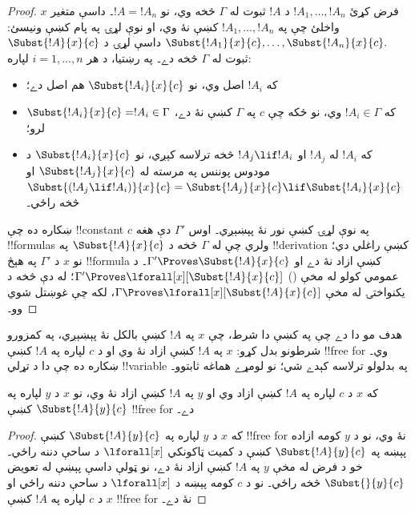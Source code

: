 \documentclass[../../../include/open-logic-section]{subfiles}
\begin{document}
\begin{proof} فرض کړئ $!A_1,\ldots,!A_n$ د $!A$ ثبوت له $\Gamma$ څخه وي، نو $!A=!A_n$۔ داسې متغير $x$ واخلئ چې په $!A_1,\ldots,!A_n$ کښې نۀ وي، او نوې لړۍ په پام کښې ونيسئ: $\Subst{!A_1}{x}{c},\ldots,\Subst{!A_n}{x}{c}.$ داسې لړۍ د $\Subst{!A}{x}{c}$ ثبوت له $\Gamma$ څخه دے۔ په رښتيا، د هر $i=1,\ldots,n$ لپاره:
\begin{itemize}
\item که $!A_i$ اصل وي، نو $\Subst{!A_i}{x}{c}$ هم اصل دے؛
\item که $!A_i \in \Gamma$ وي، نو ځکه چې $c$ په $\Gamma$ کښې نۀ دے، $\Subst{!A_i}{x}{c} = !A_i \in \Gamma$ لرو؛
\item که $!A_i$ له $!A_j$ او $!A_j \lif !A_i$ څخه ترلاسه کېږي، نو $\Subst{!A_i}{x}{c}$ د مودوس پوننس په مرسته له $\Subst{!A_j}{x}{c}$ او $\Subst{(!A_j \lif !A_i)}{x}{c}
= \Subst{!A_j}{x}{c} \lif \Subst{!A_i}{x}{c}$ څخه راځي۔
\end{itemize}
ښکاره ده چې !!{constant} $c$ په نوې لړۍ کښې نور نۀ پېښېږي۔ اوس $\Gamma'$ دې هغه !!{formula}s ولري چې له $\Gamma$ څخه د $\Subst{!A}{x}{c}$ په !!{derivation} کښې راغلي دي؛ نو $x$ د $\Gamma'$ په هېڅ !!{formula} کښې ازاد نۀ دے او $\Gamma' \Proves \Subst{!A}{x}{c}$۔ د عمومي کولو له مخې () $\Gamma'
\Proves \lforall[x][\Subst{!A}{x}{c}]$؛ له دې څخه د يکنواختۍ له مخې $\Gamma \Proves
\lforall[x][\Subst{!A}{x}{c}]$، لکه چې غوښتل شوي وو۔
\end{proof}

\begin{explain}
هدف مو دا دے چې په  کښې دا شرط، چې $x$ په $!A$ کښې بالکل نۀ پېښېږي، په کمزورو شرطونو بدل کړو: $x$ په $!A$ کښې ازاد نۀ وي او د $c$ لپاره په $!A$ کښې !!{free for} وي۔ ښکاره ده چې دا د تړلي !!{variable} په بدلولو ترلاسه کېدے شي؛ نو لومړے هماغه ثابتوو۔
\end{explain}

\begin{lem}
که $x$ د $c$ لپاره په $!A$ کښې ازاد وي او $y$ په $!A$ کښې ازاد نۀ وي، نو $x$ د $y$ لپاره په $\Subst{!A}{y}{c}$ کښې !!{free for} دے۔
\end{lem}

\begin{proof} که $x$ د $y$ لپاره په $\Subst{!A}{y}{c}$ کښې !!{free for} نۀ وي، نو د $y$ کومه ازاده پېښه په $\Subst{!A}{y}{c}$ کښې د کميت ټاکونکي $\lforall[x]$ د ساحې دننه راځي۔ خو د فرض له مخې $y$ په $!A$ کښې ازاد نۀ دے، نو ټولې داسې پېښې له تعويض $\Subst{}{y}{c}$ څخه راځي۔ نو د $c$ کومه پېښه د $\lforall[x]$ د ساحې دننه راځي او $x$ د $c$ لپاره په $!A$ کښې !!{free for} نۀ دے۔
\end{proof}
\end{document}
